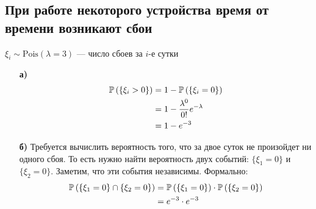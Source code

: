 \documentclass{article}
\begin{document}
\subsection{При работе некоторого устройства время от времени возникают сбои}
$\xi_i\sim\text{Pois}(\lambda=3)$ — число сбоев за $i$-е сутки
\begin{enumerate}
    \item[\textbf{а)}] \begin{equation*}
        \begin{aligned}
            \mathbb{P}\left(\{\xi_i>0\}\right)&=1-\mathbb{P}\left(\{\xi_i=0\}\right)\\
            &=1-\frac{\lambda^0}{0!}e^{-\lambda}\\
            &=1-e^{-3}
        \end{aligned}
    \end{equation*}
    \item[\textbf{б)}] Требуется вычислить вероятность того, что за двое суток не произойдет ни одного сбоя. То есть нужно найти вероятность двух событий: $\{\xi_1=0\}$ и $\{\xi_2=0\}$. Заметим, что эти события независимы. Формально:
    \begin{equation*}
        \begin{aligned}
            \mathbb{P}\left(\{\xi_1=0\}\cap\{\xi_2=0\}\right)&=\mathbb{P}\left(\{\xi_1=0\}\right)\cdot\mathbb{P}\left(\{\xi_2=0\}\right)\\
            &=e^{-3}\cdot e^{-3}
        \end{aligned}
    \end{equation*}
\end{enumerate}
\end{document}
